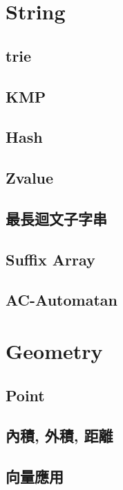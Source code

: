 \section{String}
\subsection{trie} 

\subsection{KMP} 

\subsection{Hash} 

\subsection{Zvalue} 

\subsection{最長迴文子字串} 

\subsection{Suffix Array} 

\subsection{AC-Automatan} 


\section{Geometry}
\subsection{Point} 

\subsection{內積, 外積, 距離} 

\subsection{向量應用} 

